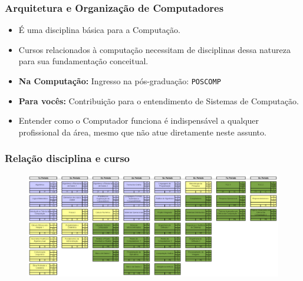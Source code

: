 \documentclass{beamer}
\begin{document}
\begin{frame}[fragile]
	\frametitle{Arquitetura e Organização de Computadores}
	\fontsize{14pt}{7.2}\selectfont
	\begin{minipage}[t][\textheight][t]{\textwidth}
		\begin{itemize}
			\item  É uma disciplina básica para a Computação.
			\item Cursos relacionados à computação necessitam de disciplinas dessa natureza para sua fundamentação conceitual.
			\item \textbf{Na Computação:} Ingresso na pós-graduação: \texttt{POSCOMP}
			\item \textbf{Para vocês:} Contribuição para o entendimento de Sistemas de Computação.
			\item Entender como o Computador funciona é indispensável a qualquer profissional da área, mesmo que não atue diretamente neste assunto.
		\end{itemize}
	\end{minipage}
\end{frame}
\begin{frame}
	\frametitle{Relação disciplina e curso}
	\begin{figure}[htbp]
		\includegraphics[width=\textwidth,height=\textheight]{figures/grade-bcc.png}
	\end{figure}
\end{frame}
\end{document}
